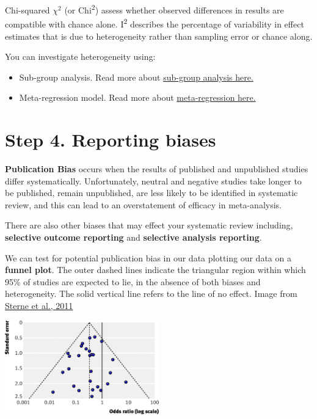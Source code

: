 \documentclass[
]{book}
\providecommand{\tightlist}{%
  \setlength{\itemsep}{0pt}\setlength{\parskip}{0pt}}
\begin{document}
Chi-squared \(\chi^2\) (or Chi\textsuperscript{2}) assess whether observed differences in results are compatible with chance alone.
I\textsuperscript{2} describes the percentage of variability in effect estimates that is due to heterogeneity rather than sampling error or chance along.

You can investigate heterogeneity using:

\begin{itemize}
\tightlist
\item
  Sub-group analysis. Read more about \href{https://bookdown.org/MathiasHarrer/Doing_Meta_Analysis_in_R/subgroup.html}{sub-group analysis here.}
\item
  Meta-regression model. Read more about \href{https://bookdown.org/MathiasHarrer/Doing_Meta_Analysis_in_R/metareg.html}{meta-regression here.}
\end{itemize}

\section{Step 4. Reporting biases}\label{step-4.-reporting-biases}

\textbf{Publication Bias} occurs when the results of published and unpublished studies differ systematically. Unfortunately, neutral and negative studies take longer to be published, remain unpublished, are less likely to be identified in systematic review, and this can lead to an overstatement of efficacy in meta-analysis.

There are also other biases that may effect your systematic review including, \textbf{selective outcome reporting} and \textbf{selective analysis reporting}.

We can test for potential publication bias in our data plotting our data on a \textbf{funnel plot}.
The outer dashed lines indicate the triangular region within which 95\% of studies are expected to lie, in the absence of both biases and heterogeneity. The solid vertical line refers to the line of no effect. Image from \href{https://www.bmj.com/content/343/bmj.d4002}{Sterne et al., 2011}

\includegraphics[width=0.5\textwidth,height=\textheight]{figs/funnelplot.jpg}
\end{document}
